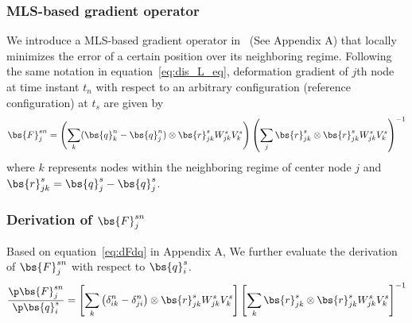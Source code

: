 \subsubsection{MLS-based gradient operator}
We introduce a MLS-based gradient operator in~\cite{Xue:2019:NL_L} (See Appendix A) that locally minimizes the error of a certain position over its neighboring regime.  
Following the same notation in equation~\eqref{eq:dis_L_eq}, deformation gradient of $j$th node at time instant $t_n$ with respect to an arbitrary configuration (reference configuration) at $t_s$ are given by
\begin{eqnarray}
    \bs{F}_j^{sn}=\left(\sum_{k}(\bs{q}_k^n-\bs{q}_j^n)\otimes \bs{r}_{jk}^s W_{jk}^s V_k^s\right)\left(\sum_{j}\bs{r}_{jk}^s\otimes\bs{r}_{jk}^s W_{jk}^s V_k^s \right)^{-1}
\label{eq:gradient_qp_0s}
\end{eqnarray}
where $k$ represents nodes within the neighboring regime of center node $j$ and $\bs{r}_{jk}^s=\bs{q}_j^s-\bs{q}_j^s$.
\subsubsection{Derivation of $\bs{F}_j^{sn}$}
Based on equation~\eqref{eq:dFdq} in Appendix A, We further evaluate the derivation of $\bs{F}_j^{sn}$ with respect to $\bs{q}_i^s$. 
\begin{eqnarray}
 \frac{\p \bs{F}_j^{sn}}{\p\bs{q}_i^s}=\left[\sum_{k}\left(\delta_{ik}^n-\delta_{ji}^n\right)\otimes \bs{r}_{jk}^s W_{jk}^s V_k^s \right]\left[\sum_{k}\bs{r}_{jk}^s\otimes \bs{r}_{jk}^s W_{jk}^s V_k^s \right]^{-1}
 \label{eq:dFjdqi}
\end{eqnarray}
